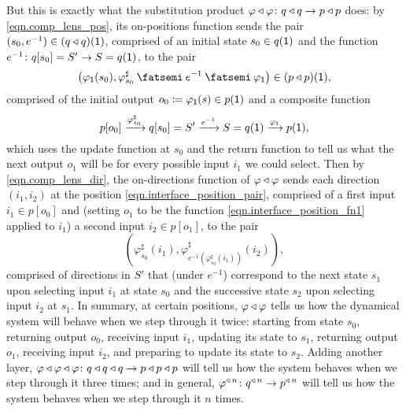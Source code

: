 \documentclass[Book-Poly]{subfiles}
\begin{document}
But this is exactly what the substitution product $\varphi\mathbin{\triangleleft}\varphi\colon q\mathbin{\triangleleft} q\to p\mathbin{\triangleleft} p$ does: by \eqref{eqn.comp_lens_pos}, its on-positions function sends the pair $(s_0,e^{-1})\in(q\mathbin{\triangleleft} q)(\textsf{1})$, comprised of an initial state $s_0\in q(\textsf{1})$ and the function $e^{-1}\colon q[s_0]=S'\to S=q(\textsf{1})$, to the pair
\begin{equation} \label{eqn.interface_position_pair}
    \left(\varphi_\1(s_0),\varphi^\sharp_{s_0}\then e^{-1}\then\varphi_\1\right)\in(p\tri p)(\1),
\end{equation}
comprised of the initial output $o_0\coloneqq\varphi_{\textsf{1}}(s)\in p(\textsf{1})$ and a composite function
\begin{equation} \label{eqn.interface_position_fn1}
    p[o_0]\xrightarrow{\varphi^\sharp_{s_0}}q[s_0]=S'\xrightarrow{e^{-1}}S=q(\textsf{1})\xrightarrow{\varphi_{\textsf{1}}}p(\textsf{1}),
\end{equation}
which uses the update function at $s_0$ and the return function to tell us what the next output $o_1$ will be for every possible input $i_1$ we could select.
Then by \eqref{eqn.comp_lens_dir}, the on-directions function of $\varphi\mathbin{\triangleleft}\varphi$ sends each direction $(i_1,i_2)$ at the position \eqref{eqn.interface_position_pair}, comprised of a first input $i_1\in p[o_0]$ and (setting $o_1$ to be the function \eqref{eqn.interface_position_fn1} applied to $i_1$) a second input $i_2\in p[o_1]$, to the pair
\[
    \left(\varphi^\sharp_{s_0}(i_1), \varphi^\sharp_{e^{-1}(\varphi^\sharp_{s_0}(i_1))}(i_2)\right),
\]
comprised of directions in $S'$ that (under $e^{-1}$) correspond to the next state $s_1$ upon selecting input $i_1$ at state $s_0$ and the successive state $s_2$ upon selecting input $i_2$ at $s_1$.
In summary, at certain positions, $\varphi\mathbin{\triangleleft}\varphi$ tells us how the dynamical system will behave when we step through it twice: starting from state $s_0$, returning output $o_0$, receiving input $i_1$, updating its state to $s_1$, returning output $o_1$, receiving input $i_2$, and preparing to update its state to $s_2$.
Adding another layer, $\varphi\mathbin{\triangleleft}\varphi\mathbin{\triangleleft}\varphi\colon q\mathbin{\triangleleft} q\mathbin{\triangleleft} q\to p\mathbin{\triangleleft} p\mathbin{\triangleleft} p$ will tell us how the system behaves when we step through it three times; and in general, $\varphi^{\mathbin{\triangleleft}\,n}\colon q^{\mathbin{\triangleleft}\,n}\to p^{\mathbin{\triangleleft}\,n}$ will tell us how the system behaves when we step through it $n$ times.
\end{document}
